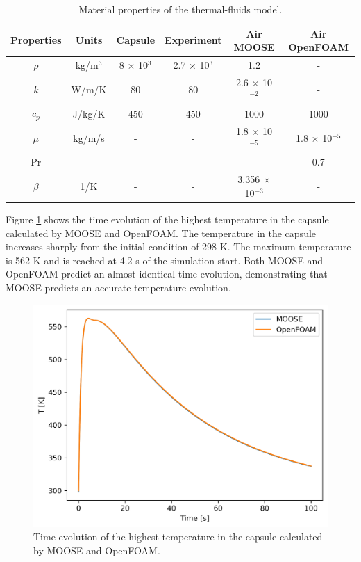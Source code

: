 \begin{table}[htbp!]
  \centering
  \caption{Material properties of the thermal-fluids model.}
  \label{tab:tf-mat}
  \begin{tabular}{cccccc}
    \toprule
      Properties & Units    & Capsule              & Experiment            & Air MOOSE                & Air OpenFOAM \\
    \midrule
      $\rho$     & kg/m$^3$ & 8 $\times$ 10$^{3}$  & 2.7 $\times$ 10$^{3}$ & 1.2                      & - \\
      $k$        & W/m/K    & 80                   & 80                    & 2.6 $\times$ 10$^{-2}$   & - \\
      $c_p$      & J/kg/K   & 450                  & 450                   & 1000                     & 1000 \\
      $\mu$      & kg/m/s   & -                    & -                     & 1.8 $\times$ 10$^{-5}$   & 1.8 $\times$ 10$^{-5}$ \\
      Pr         & -        & -                    & -                     & -                        & 0.7 \\
      $\beta$    & 1/K      & -                    & -                     & 3.356 $\times$ 10$^{-3}$ & - \\
    \bottomrule
  \end{tabular}
\end{table}

Figure \ref{fig:tf-val} shows the time evolution of the highest temperature in the capsule calculated by MOOSE and OpenFOAM.
The temperature in the capsule increases sharply from the initial condition of 298 K.
The maximum temperature is 562 K and is reached at 4.2 s of the simulation start.
Both MOOSE and OpenFOAM predict an almost identical time evolution, demonstrating that MOOSE predicts an accurate temperature evolution.

\begin{figure}[htbp!] %
    \centering
    \includegraphics[width=0.55\linewidth]{figures/verification}
    \hfill
    \caption{Time evolution of the highest temperature in the capsule calculated by MOOSE and OpenFOAM.}
    \label{fig:tf-val}
\end{figure}

